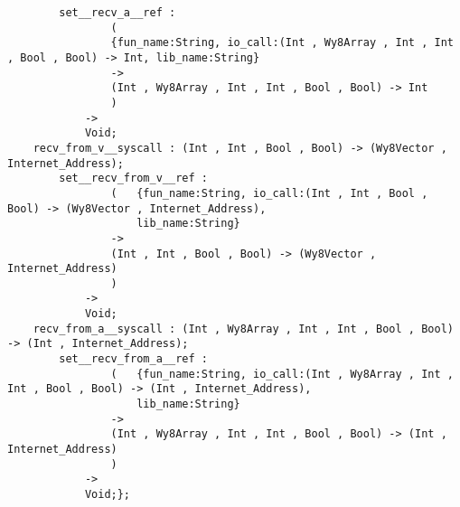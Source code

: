 \begin{verbatim}
        set__recv_a__ref :
                (
                {fun_name:String, io_call:(Int , Wy8Array , Int , Int , Bool , Bool) -> Int, lib_name:String}
                ->
                (Int , Wy8Array , Int , Int , Bool , Bool) -> Int
                )
            ->
            Void;
    recv_from_v__syscall : (Int , Int , Bool , Bool) -> (Wy8Vector , Internet_Address);
        set__recv_from_v__ref :
                (   {fun_name:String, io_call:(Int , Int , Bool , Bool) -> (Wy8Vector , Internet_Address),
                    lib_name:String}
                ->
                (Int , Int , Bool , Bool) -> (Wy8Vector , Internet_Address)
                )
            ->
            Void;
    recv_from_a__syscall : (Int , Wy8Array , Int , Int , Bool , Bool) -> (Int , Internet_Address);
        set__recv_from_a__ref :
                (   {fun_name:String, io_call:(Int , Wy8Array , Int , Int , Bool , Bool) -> (Int , Internet_Address),
                    lib_name:String}
                ->
                (Int , Wy8Array , Int , Int , Bool , Bool) -> (Int , Internet_Address)
                )
            ->
            Void;};
\end{verbatim}
